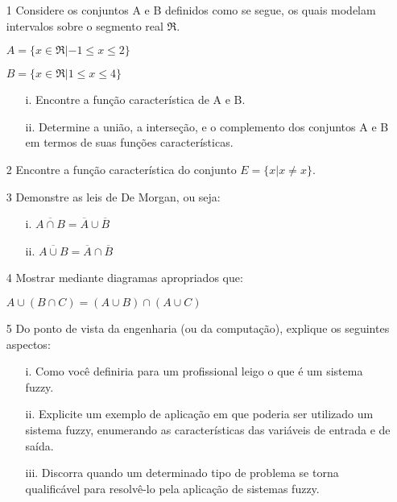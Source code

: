 \documentclass{report}
\begin{document}
\newpage

\begin{enumerate}

\item[1] Considere os conjuntos A e B definidos como se segue, os quais modelam intervalos sobre o segmento real $\Re$.

$A = \{x \in \Re | -1 \leq x \leq 2\}$

$B = \{x \in \Re |  1 \leq x \leq 4\}$ 
\begin{enumerate}
\item[i.] Encontre a função característica de A e B.

\item[ii.] Determine a união, a interseção, e o complemento dos conjuntos A e B em termos de suas funções características.
\end{enumerate}

\item[2] Encontre a função característica do conjunto $E = \{ x | x \neq x \}$.


\item[3] Demonstre as leis de De Morgan, ou seja:

\begin{enumerate}
    \item[i.] $\overline{A \cap B} = \overline{A} \cup \overline{B}$

    \item[ii.] $\overline{A \cup B} = \overline{A} \cap \overline{B}$
\end{enumerate}


\item[4] Mostrar mediante diagramas apropriados que:

$A \cup (B \cap C) = (A \cup B) \cap (A \cup C)$

\item[5] Do ponto de vista da engenharia (ou da computação), explique os seguintes aspectos:

\begin{enumerate}
\item[i.] Como você definiria para um profissional leigo o que é um sistema fuzzy.

\item[ii.] Explicite um exemplo de aplicação em que poderia ser utilizado um sistema fuzzy, 
enumerando as características das variáveis de entrada e de saída.

\item[iii.] Discorra quando um determinado tipo de problema se torna qualificável para 
resolvê-lo pela aplicação de sistemas fuzzy.
\end{enumerate}

\end{enumerate}
\end{document}
